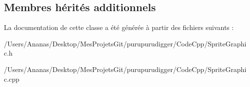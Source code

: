 \subsection*{Membres hérités additionnels}


La documentation de cette classe a été générée à partir des fichiers suivants \-:\begin{DoxyCompactItemize}
\item 
/\-Users/\-Ananas/\-Desktop/\-Mes\-Projets\-Git/purupurudigger/\-Code\-Cpp/Sprite\-Graphic.\-h\item 
/\-Users/\-Ananas/\-Desktop/\-Mes\-Projets\-Git/purupurudigger/\-Code\-Cpp/Sprite\-Graphic.\-cpp\end{DoxyCompactItemize}
